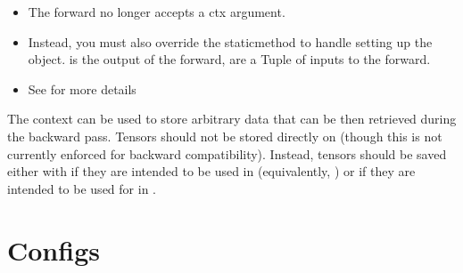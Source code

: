 \documentclass[letterpaper,10pt,english]{sphinxmanual}
\begin{document}
\begin{fulllineitems}
\begin{fulllineitems}
\begin{sphinxVerbatim}[commandchars=\\\{\}]
    \PYG{p}{[} \PYG{p}{]}    
\end{sphinxVerbatim}
\begin{itemize}
\item {} 
\sphinxAtStartPar
The forward no longer accepts a ctx argument.

\item {} 
\sphinxAtStartPar
Instead, you must also override the 
staticmethod to handle setting up the  object.
 is the output of the forward,  are a Tuple of inputs
to the forward.

\item {} 
\sphinxAtStartPar
See  for more details

\end{itemize}

\sphinxAtStartPar
The context can be used to store arbitrary data that can be then
retrieved during the backward pass. Tensors should not be stored
directly on  (though this is not currently enforced for
backward compatibility). Instead, tensors should be saved either with
 if they are intended to be used in
 (equivalently, ) or 
if they are intended to be used for in .

\end{fulllineitems}


\end{fulllineitems}



\section{Configs}
\label{\detokenize{api:module-hypyml.configs}}\label{\detokenize{api:configs}}
\end{document}

